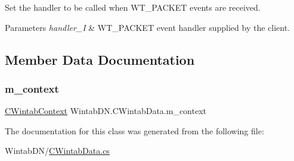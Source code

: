 Set the handler to be called when W\+T\+\_\+\+P\+A\+C\+K\+ET events are received. 


\begin{DoxyParams}{Parameters}
{\em handler\+\_\+I} & W\+T\+\_\+\+P\+A\+C\+K\+ET event handler supplied by the client.\\
\hline
\end{DoxyParams}


\subsection{Member Data Documentation}
\mbox{\label{class_wintab_d_n_1_1_c_wintab_data_ac99bcbccfa440e49f068fa194f78a3cb}} 
\subsubsection{\texorpdfstring{m\+\_\+context}{m\_context}}
{\footnotesize\ttfamily \mbox{\hyperlink{class_wintab_d_n_1_1_c_wintab_context}{C\+Wintab\+Context}} Wintab\+D\+N.\+C\+Wintab\+Data.\+m\+\_\+context\hspace{0.3cm}{\ttfamily [private]}}



The documentation for this class was generated from the following file\+:\begin{DoxyCompactItemize}
\item 
Wintab\+D\+N/\mbox{\hyperlink{_c_wintab_data_8cs}{C\+Wintab\+Data.\+cs}}\end{DoxyCompactItemize}
